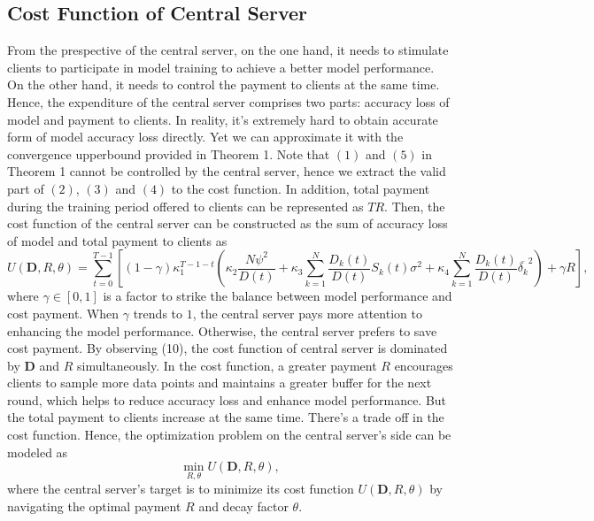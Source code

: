 \documentclass{article}
\theoremstyle{plain}
\theoremstyle{definition}
\theoremstyle{remark}
\begin{document}
\subsection{Cost Function of Central Server}
From the prespective of the central server, on the one hand, it needs to stimulate clients to participate in model training to achieve a better model performance.
On the other hand, it needs to control the payment to clients at the same time.
Hence, the expenditure of the central server comprises two parts: accuracy loss of model and payment to clients. 
In reality, it's extremely hard to obtain accurate form of model accuracy loss directly. Yet we can approximate it with the convergence upperbound provided in Theorem 1.
Note that $(1)$ and $(5)$ in Theorem 1 cannot be controlled by the central server, hence we extract the valid part of $(2)$, $(3)$ and $(4)$ to the cost function.
In addition, total payment during the training period offered to clients can be represented as $TR$.
Then, the cost function of the central server can be constructed as the sum of accuracy loss of model and total payment to clients as
\begin{equation}
  U(\boldsymbol{D}, R, \theta) = \sum_{t=0}^{T-1}\left[(1-\gamma)\kappa_1^{T-1-t} \left(\kappa_2 \frac{N\psi^2}{D(t)} + \kappa_3 \sum_{k=1}^{N} \frac{D_k(t)}{D(t)} S_k(t) \sigma^2 + \kappa_4 \sum_{k=1}^{N} \frac{D_k(t)}{D(t)} \overline{\delta_k}^2\right) + \gamma R\right],
\end{equation}
where $\gamma \in [0, 1]$ is a factor to strike the balance between model performance and cost payment. When $\gamma$ trends to $1$, the central server pays more attention to enhancing the model performance. Otherwise, the central server prefers to save cost payment.
By observing (10), the cost function of central server is dominated by $\boldsymbol{D}$ and $R$ simultaneously.
In the cost function, a greater payment $R$ encourages clients to sample more data points and maintains a greater buffer for the next round, which helps to reduce accuracy loss and enhance model performance. But the total payment to clients increase at the same time. There's a trade off in the cost function.
Hence, the optimization problem on the central server's side can be modeled as
\begin{equation}
  \min_{R,\theta}  U(\boldsymbol{D}, R, \theta), 
\end{equation}
where the central server's target is to minimize its cost function $U(\boldsymbol{D}, R, \theta)$ by navigating the optimal payment $R$ and decay factor $\theta$.
\end{document}
